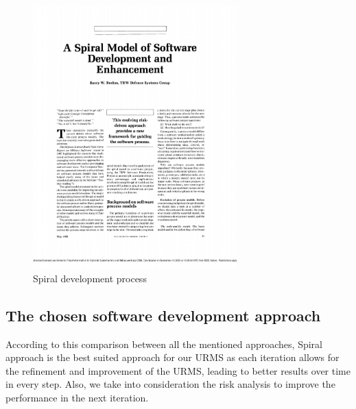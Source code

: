 \documentclass[article,onecolumn]{IEEEtran}
\begin{document}
\begin{figure}[htb]
	\centering
	\includegraphics[width=0.7\textwidth, clip, page=4, trim=3cm 10cm 3cm 3cm]{Figures/paper_models.pdf}
	\caption{Spiral development process \cite[p.64]{a6}}
	\label{fig:spiral}
\end{figure}

\subsection{The chosen software development approach}

According to this comparison between all the mentioned approaches, Spiral approach is the best suited approach for our URMS as each iteration allows for the refinement and improvement of the URMS, leading to better results over time in every step. Also, we take into consideration the risk analysis to improve the performance in the next iteration.

\end{document}

